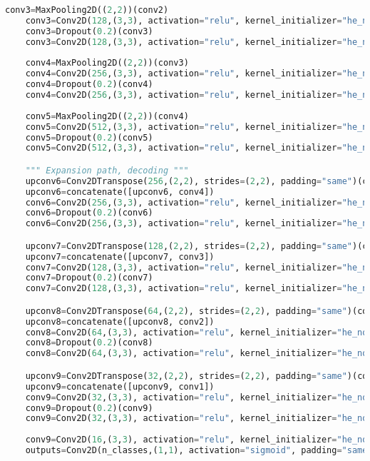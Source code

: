 \begin{lstlisting}[language=Python]
    conv3=MaxPooling2D((2,2))(conv2)
    conv3=Conv2D(128,(3,3), activation="relu", kernel_initializer="he_normal", padding="same")(conv3)
    conv3=Dropout(0.2)(conv3)
    conv3=Conv2D(128,(3,3), activation="relu", kernel_initializer="he_normal", padding="same")(conv3)
    
    conv4=MaxPooling2D((2,2))(conv3)
    conv4=Conv2D(256,(3,3), activation="relu", kernel_initializer="he_normal", padding="same")(conv4)
    conv4=Dropout(0.2)(conv4)
    conv4=Conv2D(256,(3,3), activation="relu", kernel_initializer="he_normal", padding="same")(conv4)
    
    conv5=MaxPooling2D((2,2))(conv4)
    conv5=Conv2D(512,(3,3), activation="relu", kernel_initializer="he_normal", padding="same")(conv5)
    conv5=Dropout(0.2)(conv5)
    conv5=Conv2D(512,(3,3), activation="relu", kernel_initializer="he_normal", padding="same")(conv5)

    """ Expansion path, decoding """
    upconv6=Conv2DTranspose(256,(2,2), strides=(2,2), padding="same")(conv5)
    upconv6=concatenate([upconv6, conv4])
    conv6=Conv2D(256,(3,3), activation="relu", kernel_initializer="he_normal", padding="same")(upconv6)
    conv6=Dropout(0.2)(conv6)
    conv6=Conv2D(256,(3,3), activation="relu", kernel_initializer="he_normal", padding="same")(conv6)

    upconv7=Conv2DTranspose(128,(2,2), strides=(2,2), padding="same")(conv6)
    upconv7=concatenate([upconv7, conv3])
    conv7=Conv2D(128,(3,3), activation="relu", kernel_initializer="he_normal", padding="same")(upconv7)
    conv7=Dropout(0.2)(conv7)
    conv7=Conv2D(128,(3,3), activation="relu", kernel_initializer="he_normal", padding="same")(conv7)

    upconv8=Conv2DTranspose(64,(2,2), strides=(2,2), padding="same")(conv7)
    upconv8=concatenate([upconv8, conv2])
    conv8=Conv2D(64,(3,3), activation="relu", kernel_initializer="he_normal", padding="same")(upconv8)
    conv8=Dropout(0.2)(conv8)
    conv8=Conv2D(64,(3,3), activation="relu", kernel_initializer="he_normal", padding="same")(conv8)

    upconv9=Conv2DTranspose(32,(2,2), strides=(2,2), padding="same")(conv8)
    upconv9=concatenate([upconv9, conv1])
    conv9=Conv2D(32,(3,3), activation="relu", kernel_initializer="he_normal", padding="same")(upconv9)
    conv9=Dropout(0.2)(conv9)
    conv9=Conv2D(32,(3,3), activation="relu", kernel_initializer="he_normal", padding="same")(conv9)
    
    conv9=Conv2D(16,(3,3), activation="relu", kernel_initializer="he_normal", padding="same")(conv9)
    outputs=Conv2D(n_classes,(1,1), activation="sigmoid", padding="same")(conv9)



\end{lstlisting}
